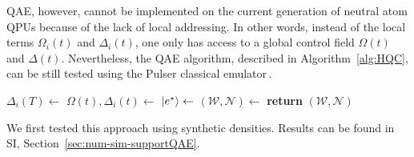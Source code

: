 \documentclass[fleqn,10pt]{wlscirep}
\begin{document}
QAE, however, cannot be implemented on the current generation of neutral atom QPUs because of the lack of local addressing. In other words, instead of the local terms $\Omega_i(t)$ and $\Delta_i(t)$, one only has access to a global control field $\Omega(t)$ and $\Delta(t)$. Nevertheless, the QAE algorithm, described in Algorithm~\ref{alg:HQC},  can be still tested using the Pulser classical emulator\,\cite{pulser}. 


\begin{algorithm}[htpb]
\caption{Quantum Adiabatic Evolution (QAE) algorithm that solves the corresponding Ising problem in eq.~\eqref{eq:problem_hamiltonian} using local lasers.\newline
\textbf{inputs}: reference 2D density $g(\vec{r}) : \mathcal{C} \rightarrow \mathbb{R}$ and set of qubits position $Q := \{\vec{q}_i\} \subset \mathcal{C}$, with $\mathcal{C} \subset \mathbb{R}^{2}$. $\Omega$ is set according to the known adiabatic protocol, fitting the three points $[0,\Omega_{Max},0]$ during the whole pulse duration $[0,T]$ and $\Delta$ is computed according to eq.~\eqref{eq:gamma-local}.\newline
\textbf{outputs}: water molecule positions $\mathcal{W}$ and their number $\mathcal{N}$.
}
\label{alg:HQC}
\begin{algorithmic}[1]
\Statex
{}
    \Statex
    \State $\Delta_i(T) \gets$ 
    \State $\Omega(t),\Delta_i(t) \gets$ 
    \State $\ket{e^*} \gets $ 
    \Statex
    \State $(\mathcal{W}, \mathcal{N}) \gets$ 
    \State \textbf{return} $(\mathcal{W}, \mathcal{N})$ 
    \Statex
\EndProcedure
\end{algorithmic}
\end{algorithm}

We first tested this approach using synthetic densities. Results can be found in SI, Section~\ref{sec:num-sim-supportQAE}.
\end{document}
